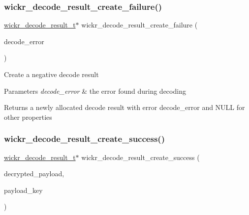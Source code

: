 \subsubsection{\texorpdfstring{wickr\+\_\+decode\+\_\+result\+\_\+create\+\_\+failure()}{wickr\_decode\_result\_create\_failure()}}
{\footnotesize\ttfamily \mbox{\hyperlink{structwickr__decode__result}{wickr\+\_\+decode\+\_\+result\+\_\+t}}$\ast$ wickr\+\_\+decode\+\_\+result\+\_\+create\+\_\+failure (\begin{DoxyParamCaption}\item[{wickr\+\_\+decode\+\_\+error}]{decode\+\_\+error }\end{DoxyParamCaption})}

Create a negative decode result


\begin{DoxyParams}{Parameters}
{\em decode\+\_\+error} & the error found during decoding \\
\hline
\end{DoxyParams}
\begin{DoxyReturn}{Returns}
a newly allocated decode result with error \textquotesingle{}decode\+\_\+error\textquotesingle{} and N\+U\+LL for other properties 
\end{DoxyReturn}
\mbox{\label{group__wickr__protocol_ga633aaf4cb6159be0110401f06dae458c}} 
\subsubsection{\texorpdfstring{wickr\+\_\+decode\+\_\+result\+\_\+create\+\_\+success()}{wickr\_decode\_result\_create\_success()}}
{\footnotesize\ttfamily \mbox{\hyperlink{structwickr__decode__result}{wickr\+\_\+decode\+\_\+result\+\_\+t}}$\ast$ wickr\+\_\+decode\+\_\+result\+\_\+create\+\_\+success (\begin{DoxyParamCaption}\item[{\mbox{\hyperlink{structwickr__payload}{wickr\+\_\+payload\+\_\+t}} $\ast$}]{decrypted\+\_\+payload,  }\item[{\mbox{\hyperlink{structwickr__cipher__key}{wickr\+\_\+cipher\+\_\+key\+\_\+t}} $\ast$}]{payload\+\_\+key }\end{DoxyParamCaption})}

